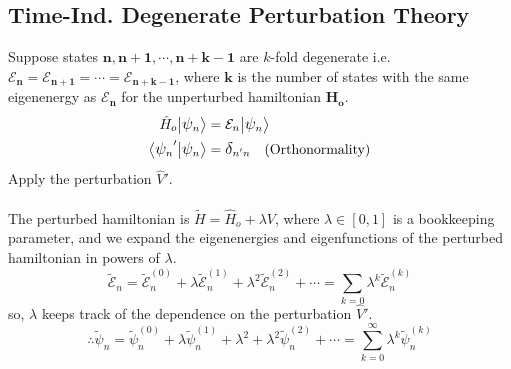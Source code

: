 \documentclass[12pt,fancychapters]{report}
\numberwithin{equation}{section}
\begin{document}
\subsection*{Time-Ind. Degenerate Perturbation Theory}
Suppose states $\mathbf{n, n+1, \cdots, n+k-1}$ are $k$-fold degenerate i.e. $\mathbf{
\mathcal{E}_n= \mathcal{E}_{n+1} = \cdots = \mathcal{E}_{n+k-1}}$, where $\mathbf{k}$ 
is the number of states with the same eigenenergy as $\mathbf{\mathcal{E}_n}$ for the 
unperturbed hamiltonian $\mathbf{\hat{H}_o}$.
\begin{align*}
	\hat{H}_o \big|\mathlarger{\psi}_n\big> &= \mathcal{E}_n\big|\mathlarger{\psi}_n \big>\\
	\big<\mathlarger{\psi}_n'\big|\mathlarger{\psi}_n\big> &= \mathlarger{\delta}_{n'n}\quad 
	\text{(Orthonormality)}
\end{align*}
Apply the perturbation $\hat{V}'$.\\
\\
The perturbed hamiltonian is $\tilde{H}=\hat{H}_o + \lambda V$, where $\lambda \in [0,1]$ is a 
bookkeeping parameter, and we expand the eigenenergies and eigenfunctions of the perturbed hamiltonian
in powers of $\lambda$.
\begin{equation*}
	\tilde{\mathcal{E}}_n = \tilde{\mathcal{E}}_n^{(0)}+\lambda \tilde{\mathcal{E}}_n^{(1)}
	+ \lambda^2 \tilde{\mathcal{E}}_n^{(2)} + \cdots = \sum_{k=0}\lambda^k 
	\tilde{\mathcal{E}}_n^{(k)}
\end{equation*}
so, $\lambda$ keeps track of the dependence on the perturbation $\hat{V}'$.
\begin{equation*}
	\therefore \tilde{\psi}_n = \tilde{\psi}_n^{(0)}+\lambda\tilde{\psi}_n^{(1)}+\lambda^2 
	+\lambda^2\tilde{\psi}_n^{(2)}+\cdots = \sum_{k=0}^{\infty}\lambda^k \tilde{\psi}_n^{(k)}
\end{equation*}
\end{document}

